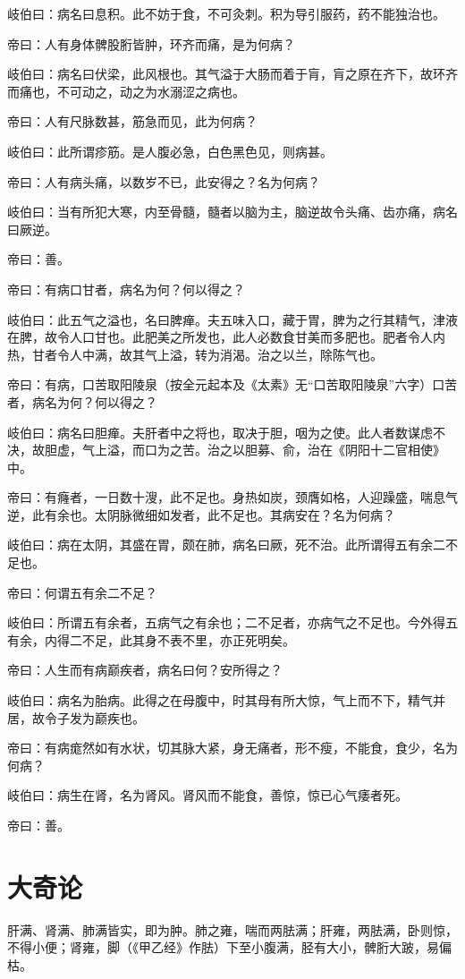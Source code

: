 \documentclass{article}%
\begin{document}
岐伯曰：病名曰息积。此不妨于食，不可灸刺。积为导引服药，药不能独治也。

帝曰：人有身体髀股胻皆肿，环齐而痛，是为何病？

岐伯曰：病名曰伏梁，此风根也。其气溢于大肠而着于肓，肓之原在齐下，故环齐而痛也，不可动之，动之为水溺涩之病也。

帝曰：人有尺脉数甚，筋急而见，此为何病？

岐伯曰：此所谓疹筋。是人腹必急，白色黑色见，则病甚。

帝曰：人有病头痛，以数岁不已，此安得之？名为何病？

岐伯曰：当有所犯大寒，内至骨髓，髓者以脑为主，脑逆故令头痛、齿亦痛，病名曰厥逆。

帝曰：善。

帝曰：有病口甘者，病名为何？何以得之？

岐伯曰：此五气之溢也，名曰脾瘅。夫五味入口，藏于胃，脾为之行其精气，津液在脾，故令人口甘也。此肥美之所发也，此人必数食甘美而多肥也。肥者令人内热，甘者令人中满，故其气上溢，转为消渴。治之以兰，除陈气也。

帝曰：有病，口苦取阳陵泉（按全元起本及《太素》无“口苦取阳陵泉”六字）口苦者，病名为何？何以得之？

岐伯曰：病名曰胆瘅。夫肝者中之将也，取决于胆，咽为之使。此人者数谋虑不决，故胆虚，气上溢，而口为之苦。治之以胆募、俞，治在《阴阳十二官相使》中。

帝曰：有癃者，一日数十溲，此不足也。身热如炭，颈膺如格，人迎躁盛，喘息气逆，此有余也。太阴脉微细如发者，此不足也。其病安在？名为何病？

岐伯曰：病在太阴，其盛在胃，颇在肺，病名曰厥，死不治。此所谓得五有余二不足也。

帝曰：何谓五有余二不足？

岐伯曰：所谓五有余者，五病气之有余也；二不足者，亦病气之不足也。今外得五有余，内得二不足，此其身不表不里，亦正死明矣。

帝曰：人生而有病巅疾者，病名曰何？安所得之？

岐伯曰：病名为胎病。此得之在母腹中，时其母有所大惊，气上而不下，精气并居，故令子发为巅疾也。

帝曰：有病痝然如有水状，切其脉大紧，身无痛者，形不瘦，不能食，食少，名为何病？

岐伯曰：病生在肾，名为肾风。肾风而不能食，善惊，惊已心气痿者死。

帝曰：善。
\section{大奇论}
肝满、肾满、肺满皆实，即为肿。肺之雍，喘而两胠满；肝雍，两胠满，卧则惊，不得小便；肾雍，脚（《甲乙经》作胠）下至小腹满，胫有大小，髀胻大跛，易偏枯。
\end{document}
